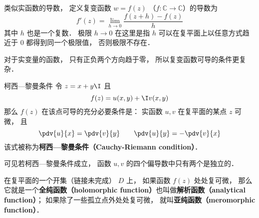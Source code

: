 
\begin{issues}
\issueDraft
\end{issues}


\begin{definition}{}
类似实函数的导数， 定义复变函数 $w = f(z)$ （$f:\mathbb C\to \mathbb C$）的导数为
\begin{equation}\label{CauRie_eq4}
f'(z) = \lim_{h\to 0} \frac{f(z + h) - f(z)}{h}
\end{equation}
其中 $h$ 也是一个复数． 极限 $h \to 0$ 在这里是指 $h$ 可以在复平面上以任意方式趋近于 $0$ 都得到同一个极限值， 否则极限不存在．
\end{definition}

对于实变量的函数， 只有正负两个方向趋于零， 所以复变函数可导的条件更复杂．

\begin{theorem}{柯西—黎曼条件}
令 $z = x + y\I$ 且
\begin{equation}
f(z) = u(x, y) + \I v(x, y)
\end{equation}
那么 $f(z)$ 在该点可导的充分必要条件是： 实函数 $u,v$ 在复平面的某点 $z$ 可微， 且
\begin{equation}\label{CauRie_eq1}
\pdv{u}{x} = \pdv{v}{y} \qquad
\pdv{u}{y} = - \pdv{v}{x}
\end{equation}
该式被称为\textbf{柯西—黎曼条件（Cauchy-Riemann condition）}．
\end{theorem}
可见若柯西—黎曼条件成立， 函数 $u,v$ 的四个偏导数中只有两个是独立的．

在复平面的一个开集（链接未完成） $D$ 上， 如果函数 $f(z)$ 处处复可微， 那么它就是一个\textbf{全纯函数（holomorphic function）}也叫做\textbf{解析函数（analytical function）}； 如果除了一些孤立点外处处复可微， 就叫\textbf{亚纯函数（meromorphic function）}．

